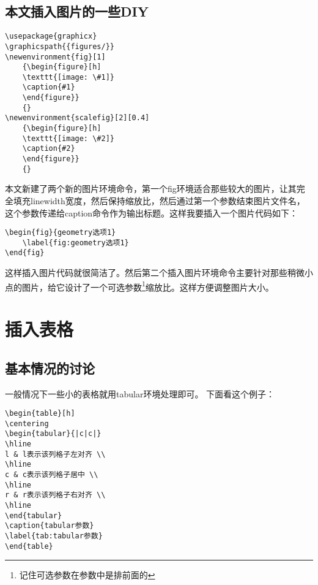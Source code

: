 \subsection{本文插入图片的一些DIY}
\begin{verbatim}
\usepackage{graphicx}
\graphicspath{{figures/}}
\newenvironment{fig}[1]
	{\begin{figure}[h]
	\texttt{[image: \#1]}
	\caption{#1}
	\end{figure}}
	{}	
\newenvironment{scalefig}[2][0.4]
	{\begin{figure}[h]
	\texttt{[image: \#2]}
	\caption{#2}
	\end{figure}}
	{}	
\end{verbatim}
本文新建了两个新的图片环境命令，第一个fig环境适合那些较大的图片，让其完全填充linewidth宽度，然后保持缩放比，然后通过第一个参数结束图片文件名，这个参数传递给caption命令作为输出标题。这样我要插入一个图片代码如下：
\begin{verbatim}
\begin{fig}{geometry选项1}   
	\label{fig:geometry选项1}
\end{fig}
\end{verbatim}
这样插入图片代码就很简洁了。然后第二个插入图片环境命令主要针对那些稍微小点的图片，给它设计了一个可选参数\footnote{记住可选参数在参数中是排前面的}缩放比。这样方便调整图片大小。

\section{插入表格}
\subsection{基本情况的讨论}
一般情况下一些小的表格就用tabular环境处理即可。
下面看这个例子：
\begin{verbatim}
\begin{table}[h]
\centering
\begin{tabular}{|c|c|}
\hline
l & l表示该列格子左对齐 \\
\hline
c & c表示该列格子居中 \\
\hline
r & r表示该列格子右对齐 \\
\hline
\end{tabular}
\caption{tabular参数}
\label{tab:tabular参数}
\end{table}
\end{verbatim}

